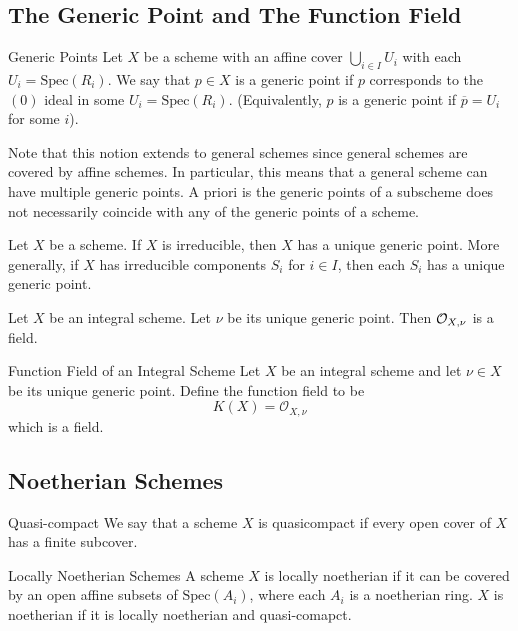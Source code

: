 \documentclass[a4paper]{article}
\begin{document}
\subsection{The Generic Point and The Function Field}
\begin{defn}{Generic Points}{} Let $X$ be a scheme with an affine cover $\bigcup_{i\in I}U_i$ with each $U_i=\text{Spec}(R_i)$. We say that $p\in X$ is a generic point if $p$ corresponds to the $(0)$ ideal in some $U_i=\text{Spec}(R_i)$. (Equivalently, $p$ is a generic point if $\overline{p}=U_i$ for some $i$). 
\end{defn}

Note that this notion extends to general schemes since general schemes are covered by affine schemes. In particular, this means that a general scheme can have multiple generic points. A priori is the generic points of a subscheme does not necessarily coincide with any of the generic points of a scheme. 

\begin{prp}{}{} Let $X$ be a scheme. If $X$ is irreducible, then $X$ has a unique generic point. More generally, if $X$ has irreducible components $S_i$ for $i\in I$, then each $S_i$ has a unique generic point. 
\end{prp}

\begin{prp}{}{} Let $X$ be an integral scheme. Let $\nu$ be its unique generic point. Then $\mathcal{O}_{X,\nu}$ is a field. 
\end{prp}

\begin{defn}{Function Field of an Integral Scheme}{} Let $X$ be an integral scheme and let $\nu\in X$ be its unique generic point. Define the function field to be $$K(X)=\mathcal{O}_{X,\nu}$$ which is a field. 
\end{defn}

\subsection{Noetherian Schemes}
\begin{defn}{Quasi-compact}{} We say that a scheme $X$ is quasicompact if every open cover of $X$ has a finite subcover. 
\end{defn}

\begin{defn}{Locally Noetherian Schemes}{} A scheme $X$ is locally noetherian if it can be covered by an open affine subsets of $\text{Spec}(A_i)$, where each $A_i$ is a noetherian ring. $X$ is noetherian if it is locally noetherian and quasi-comapct. 
\end{defn}
\end{document}
